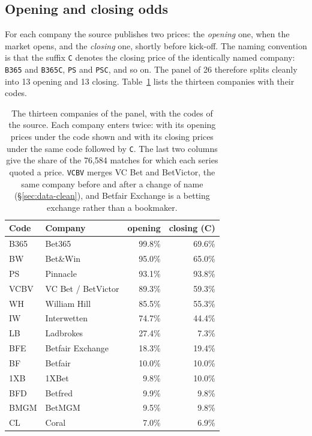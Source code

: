 \documentclass[12pt,a4paper,oneside]{report}
\newcommand{\file}[1]{\texttt{#1}}
\renewcommand{\_}{\oldunderscore\allowbreak}
\theoremstyle{definition}
\theoremstyle{plain}
\theoremstyle{definition}   %
\begin{document}
\subsection{Opening and closing odds}
\label{sec:openclose}

For each company the source publishes two prices: the \emph{opening} one, when the market opens,
and the \emph{closing} one, shortly before kick-off. The naming convention is that the suffix
\file{C} denotes the closing price of the identically named company: \file{B365} and
\file{B365C}, \file{PS} and \file{PSC}, and so on. The panel of 26 therefore splits cleanly into
13 opening and 13 closing. Table~\ref{tab:books} lists the thirteen companies with their codes.

\begin{table}[H]
\centering
\small
\begin{tabular}{@{}llrr@{}}
\toprule
\textbf{Code} & \textbf{Company} & \textbf{opening} & \textbf{closing (C)} \\
\midrule
B365   & Bet365             & 99.8\% & 69.6\% \\
BW     & Bet\&Win           & 95.0\% & 65.0\% \\
PS     & Pinnacle           & 93.1\% & 93.8\% \\
VC\_BV & VC Bet / BetVictor & 89.3\% & 59.3\% \\
WH     & William Hill       & 85.5\% & 55.3\% \\
IW     & Interwetten        & 74.7\% & 44.4\% \\
LB     & Ladbrokes          & 27.4\% &  7.3\% \\
BFE    & Betfair Exchange   & 18.3\% & 19.4\% \\
BF     & Betfair            & 10.0\% & 10.0\% \\
1XB    & 1XBet              &  9.8\% & 10.0\% \\
BFD    & Betfred            &  9.9\% &  9.8\% \\
BMGM   & BetMGM             &  9.5\% &  9.8\% \\
CL     & Coral              &  7.0\% &  6.9\% \\
\bottomrule
\end{tabular}
\caption{The thirteen companies of the panel, with the codes of the source. Each company enters
twice: with its opening prices under the code shown and with its closing prices under the same
code followed by \file{C}. The last two columns give the share of the 76,584 matches for which
each series quoted a price. \file{VC\_BV} merges VC Bet and BetVictor, the same company before
and after a change of name (\S\ref{sec:data-clean}), and Betfair Exchange is a betting exchange
rather than a bookmaker.}
\label{tab:books}
\end{table}
\end{document}
